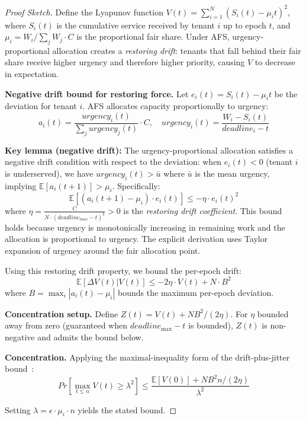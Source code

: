 \documentclass[sigconf]{acmart}
\begin{document}
\begin{proof}[Proof Sketch]
Define the Lyapunov function $V(t) = \sum_{i=1}^{N} (S_i(t) - \mu_i t)^2$, where $S_i(t)$ is the cumulative service received by tenant $i$ up to epoch $t$, and $\mu_i = W_i / \sum_j W_j \cdot C$ is the proportional fair share. Under AFS, urgency-proportional allocation creates a \emph{restoring drift}: tenants that fall behind their fair share receive higher urgency and therefore higher priority, causing $V$ to decrease in expectation.

\textbf{Negative drift bound for restoring force.} Let $e_i(t) = S_i(t) - \mu_i t$ be the deviation for tenant $i$. AFS allocates capacity proportionally to urgency:
\begin{equation}
    a_i(t) = \frac{urgency_i(t)}{\sum_j urgency_j(t)} \cdot C, \quad urgency_i(t) = \frac{W_i - S_i(t)}{deadline_i - t}
\end{equation}

\textbf{Key lemma (negative drift):} The urgency-proportional allocation satisfies a negative drift condition with respect to the deviation: when $e_i(t) < 0$ (tenant $i$ is underserved), we have $urgency_i(t) > \bar{u}$ where $\bar{u}$ is the mean urgency, implying $\mathbb{E}[a_i(t+1)] > \mu_i$. Specifically:
\begin{equation}
    \mathbb{E}[(a_i(t+1) - \mu_i) \cdot e_i(t)] \leq -\eta \cdot e_i(t)^2
\end{equation}
where $\eta = \frac{C}{N \cdot (deadline_{max} - t)^2} > 0$ is the \emph{restoring drift coefficient}. This bound holds because urgency is monotonically increasing in remaining work and the allocation is proportional to urgency. The explicit derivation uses Taylor expansion of urgency around the fair allocation point.

Using this restoring drift property, we bound the per-epoch drift:
\begin{equation}
    \mathbb{E}[\Delta V(t) | V(t)] \leq -2\eta \cdot V(t) + N \cdot B^2
\end{equation}
where $B = \max_i |a_i(t) - \mu_i|$ bounds the maximum per-epoch deviation.

\textbf{Concentration setup.} Define $Z(t) = V(t) + NB^2/(2\eta)$. For $\eta$ bounded away from zero (guaranteed when $deadline_\text{max} - t$ is bounded), $Z(t)$ is non-negative and admits the bound below.

\textbf{Concentration.} Applying the maximal-inequality form of the drift-plus-jitter bound~\cite{dubhashi2009concentration}:
\begin{equation}
    Pr\left[\max_{t \leq n} V(t) \geq \lambda^2\right] \leq \frac{\mathbb{E}[V(0)] + NB^2n/(2\eta)}{\lambda^2}
\end{equation}

Setting $\lambda = \epsilon \cdot \mu_i \cdot n$ yields the stated bound.
\end{proof}
\end{document}

